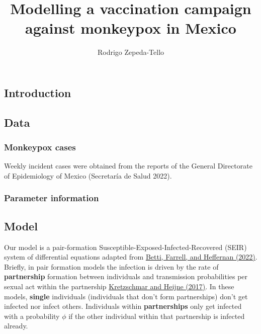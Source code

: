 \documentclass[
  letterpaper,
  DIV=11,
  numbers=noendperiod]{scrartcl}
\title{Modelling a vaccination campaign against monkeypox in Mexico}
\author{Rodrigo Zepeda-Tello}
\date{}
\begin{document}
\maketitle
\ifdefined\Shaded\renewenvironment{Shaded}{\begin{tcolorbox}[enhanced, interior hidden, boxrule=0pt, breakable, borderline west={3pt}{0pt}{shadecolor}, sharp corners, frame hidden]}{\end{tcolorbox}}\fi

\hypertarget{introduction}{%
\subsection{Introduction}\label{introduction}}

\hypertarget{data}{%
\subsection{Data}\label{data}}

\hypertarget{monkeypox-cases}{%
\subsubsection{Monkeypox cases}\label{monkeypox-cases}}

Weekly incident cases were obtained from the reports of the General
Directorate of Epidemiology of Mexico (Secretaría de Salud 2022).

\hypertarget{parameter-information}{%
\subsubsection{Parameter information}\label{parameter-information}}

\hypertarget{model}{%
\subsection{Model}\label{model}}

Our model is a pair-formation Susceptible-Exposed-Infected-Recovered
(SEIR) system of differential equations adapted from
\href{https://doi.org/10.1101/2022.08.17.22278897}{Betti, Farrell, and
Heffernan (2022)}. Briefly, in pair formation models the infection is
driven by the rate of \textbf{partnership} formation between individuals
and transmission probabilities per sexual act within the partnership
\href{https://doi.org/10.1016/j.idm.2017.07.002}{Kretzschmar and Heijne
(2017)}. In these models, \textbf{single} individuals (individuals that
don't form partnerships) don't get infected nor infect others.
Individuals within \textbf{partnerships} only get infected with a
probability \(\phi\) if the other individual within that partnership is
infected already.
\end{document}
